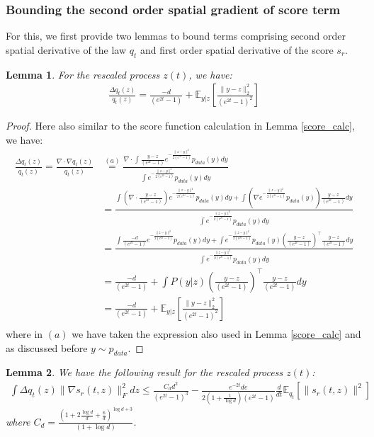 \documentclass{article}
\newtheorem{lemma}{Lemma}[section]
\begin{document}
\subsubsection{Bounding the second order spatial gradient of score term}
\noindent
For this, we first provide two lemmas to bound terms comprising second order spatial derivative of the law $q_t$ and first order spatial derivative of the score $s_r$.
\begin{lemma}
\label{nabla_p_by_p_calc}
    For the rescaled process $z(t)$, we have:
    \begin{align*}
        \frac{\Delta q_t(z)}{q_t(z)} = \frac{-d}{(e^{2t}-1)} + \mathbb{E}_{y|z}\left[\frac{\|y-z\|^2_2}{(e^{2t}-1)^2}\right]
    \end{align*}
\end{lemma}
\begin{proof}
Here also similar to the score function calculation in Lemma \ref{score_calc}, we have:
    \begin{align*}
        \frac{\Delta q_t(z)}{q_t(z)} = \frac{\nabla \cdot \nabla q_t(z)}{q_t(z)} &\overset{(a)}{=} \frac{ \nabla \cdot \int \frac{y-z}{(e^{2t}-1)} e^{-\frac{\|z-y\|^2}{2(e^{2t}-1)}} p_{data}(y) dy}{\int   e^{-\frac{\|z-y\|^2}{2(e^{2t}-1)}} p_{data}(y) dy} \\
        &= \frac{   \int \left(\nabla\cdot \frac{y-z}{(e^{2t}-1)}\right) e^{-\frac{\|z-y\|^2}{2(e^{2t}-1)}} p_{data}(y) dy + \int  \left(\nabla e^{-\frac{\|z-y\|^2}{2(e^{2t}-1)}} p_{data}(y) \right)  \frac{y-z}{(e^{2t}-1)} dy }{\int   e^{-\frac{\|z-y\|^2}{2(e^{2t}-1)}} p_{data}(y) dy} \\
         &= \frac{   \int \frac{-d}{(e^{2t}-1)} e^{-\frac{\|z-y\|^2}{2(e^{2t}-1)}} p_{data}(y) dy + \int e^{-\frac{\|z-y\|^2}{2(e^{2t}-1)}} p_{data}(y) \left(\frac{y-z}{(e^{2t}-1)}\right)^\top\frac{y-z}{(e^{2t}-1)}     dy }{\int   e^{-\frac{\|z-y\|^2}{2(e^{2t}-1)}} p_{data}(y) dy} \\
         &=  \frac{-d}{(e^{2t}-1)} + { \int P(y|z) \left(\frac{y-z}{(e^{2t}-1)}\right)^\top\frac{y-z}{(e^{2t}-1)}     dy } \\
         &=  \frac{-d}{(e^{2t}-1)} + \mathbb{E}_{y|z}\left[\frac{\|y-z\|^2_2}{(e^{2t}-1)^2}\right] \\
    \end{align*}
    where in $(a)$ we have taken the expression also used in Lemma \ref{score_calc} and as discussed before $y\sim p_{data}$. 
\end{proof}

\begin{lemma}
\label{hess_p_grad_s_norm}
    We have the following result for the rescaled process $z(t)$:
    \begin{align*}
         \int \Delta q_t(z) \|\nabla s_r(t,z)\|^2_F dz \leq  \frac{C_dd^2}{(e^{2t}-1)^{3}}    -  \frac{e^{-2t}de}{2(1+\frac{1}{\log d})(e^{2t}-1)}\frac{d}{dt}\mathbb{E}_{q_t}[\|s_r(t,z)\|^2]  
    \end{align*}
    where $C_d =\frac{(1+2\frac{\log d}{d}+\frac{6}{d})^{\log d+3}}{(1+\log d)}$.
\end{lemma}
\end{document}

